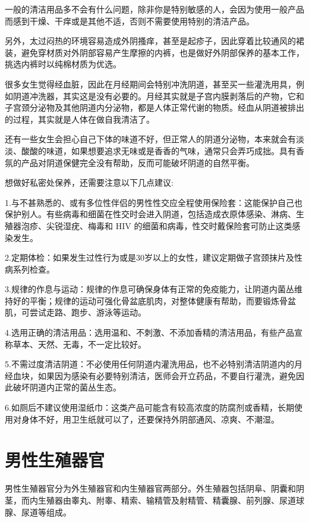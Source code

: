 \documentclass[12pt,UTF8]{ctexbook}
\begin{document}
一般的清洁用品多不会有什么问题，除非你是特别敏感的人，会因为使用一般产品而感到干燥、干痒或是其他不适，否则不需要使用特别的清洁产品。

另外，太过闷热的环境容易造成外阴搔痒，甚至是起疹子，因此穿着比较通风的裙装，避免穿材质对外阴部容易产生摩擦的内裤，也是做好外阴部保养的基本工作，挑选内裤时以纯棉材质为优选。

很多女生觉得经血脏，因此在月经期间会特别冲洗阴道，甚至买一些灌洗用具，例如阴道冲洗器，其实这是没有必要的。月经其实就是子宫内膜剥落后的产物，它和子宫颈分泌物及其他阴道内分泌物，都是人体正常代谢的物质。经血从阴道被排出的过程，其实就是人体在做自我清洁了。

还有一些女生会担心自己下体的味道不好，但正常人的阴道分泌物，本来就会有淡淡、酸酸的味道，如果想要追求无味或是香香的气味，通常只会弄巧成拙。具有香氛的产品对阴道保健完全没有帮助，反而可能破坏阴道的自然平衡。

想做好私密处保养，还需要注意以下几点建议:

1.与不甚熟悉的、或有多位性伴侣的男性性交应全程使用保险套：这能保护自己也保护别人。有些病毒和细菌在性交时会进入阴道，包括造成衣原体感染、淋病、生殖器泡疹、尖锐湿疣、梅毒和 HIV 的细菌和病毒，性交时戴保险套可防止这类感染发生。

2.定期体检：如果发生过性行为或是30岁以上的女性，建议定期做子宫颈抹片及性病系列检查。

3.规律的作息与运动：规律的作息可确保身体有正常的免疫能力，让阴道内菌丛维持好的平衡；规律的运动可强化骨盆底肌肉，对整体健康有帮助，而要锻炼骨盆肌，可尝试走路、跑步、游泳等运动。

4.选用正确的清洁用品：选用温和、不刺激、不添加香精的清洁用品，有些产品宣称草本、天然、无毒，不一定比较好。

5.不需过度清洁阴道：不必使用任何阴道内灌洗用品，也不必特别清洁阴道内的月经血块，如果因为感染有必要特别清洁，医师会开立药品，不要自行灌洗，避免因此破坏阴道内正常的菌丛生态。

6.如厕后不建议使用湿纸巾：这类产品可能含有较高浓度的防腐剂或香精，长期使用对身体不好，用卫生纸就可以了，还要保持外阴部通风、凉爽、不潮湿。

\chapter{男性生殖器官}

男性生殖器官分为外生殖器官和内生殖器官两部分。外生殖器包括阴阜、阴囊和阴茎，而内生殖器由睾丸、附睾、精索、输精管及射精管、精囊腺、前列腺、尿道球腺、尿道等组成。
\end{document}
